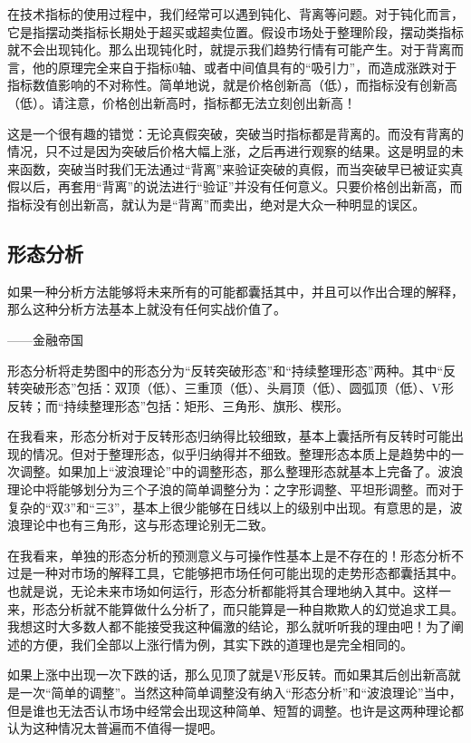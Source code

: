 在技术指标的使用过程中，我们经常可以遇到钝化、背离等问题。对于钝化而言，它是指摆动类指标长期处于超买或超卖位置。假设市场处于整理阶段，摆动类指标就不会出现钝化。那么出现钝化时，就提示我们趋势行情有可能产生。对于背离而言，他的原理完全来自于指标0轴、或者中间值具有的“吸引力”，而造成涨跌对于指标数值影响的不对称性。简单地说，就是价格创新高（低），而指标没有创新高（低）。请注意，价格创出新高时，指标都无法立刻创出新高！

这是一个很有趣的错觉：无论真假突破，突破当时指标都是背离的。而没有背离的情况，只不过是因为突破后价格大幅上涨，之后再进行观察的结果。这是明显的未来函数，突破当时我们无法通过“背离”来验证突破的真假，而当突破早已被证实真假以后，再套用“背离”的说法进行“验证”并没有任何意义。只要价格创出新高，而指标没有创出新高，就认为是“背离”而卖出，绝对是大众一种明显的误区。

\subsection{形态分析}

{\kaishu
如果一种分析方法能够将未来所有的可能都囊括其中，并且可以作出合理的解释，那么这种分析方法基本上就没有任何实战价值了。

\hfill ——金融帝国
}

形态分析将走势图中的形态分为“反转突破形态”和“持续整理形态”两种。其中“反转突破形态”包括：双顶（低）、三重顶（低）、头肩顶（低）、圆弧顶（低）、V形反转；而“持续整理形态”包括：矩形、三角形、旗形、楔形。

在我看来，形态分析对于反转形态归纳得比较细致，基本上囊括所有反转时可能出现的情况。但对于整理形态，似乎归纳得并不细致。整理形态本质上是趋势中的一次调整。如果加上“波浪理论”中的调整形态，那么整理形态就基本上完备了。波浪理论中将能够划分为三个子浪的简单调整分为：之字形调整、平坦形调整。而对于复杂的“双3”和“三3”，基本上很少能够在日线以上的级别中出现。有意思的是，波浪理论中也有三角形，这与形态理论别无二致。

在我看来，单独的形态分析的预测意义与可操作性基本上是不存在的！形态分析不过是一种对市场的解释工具，它能够把市场任何可能出现的走势形态都囊括其中。也就是说，无论未来市场如何运行，形态分析都能将其合理地纳入其中。这样一来，形态分析就不能算做什么分析了，而只能算是一种自欺欺人的幻觉追求工具。我想这时大多数人都不能接受我这种偏激的结论，那么就听听我的理由吧！为了阐述的方便，我们全部以上涨行情为例，其实下跌的道理也是完全相同的。

如果上涨中出现一次下跌的话，那么见顶了就是V形反转。而如果其后创出新高就是一次“简单的调整”。当然这种简单调整没有纳入“形态分析”和“波浪理论”当中，但是谁也无法否认市场中经常会出现这种简单、短暂的调整。也许是这两种理论都认为这种情况太普遍而不值得一提吧。

